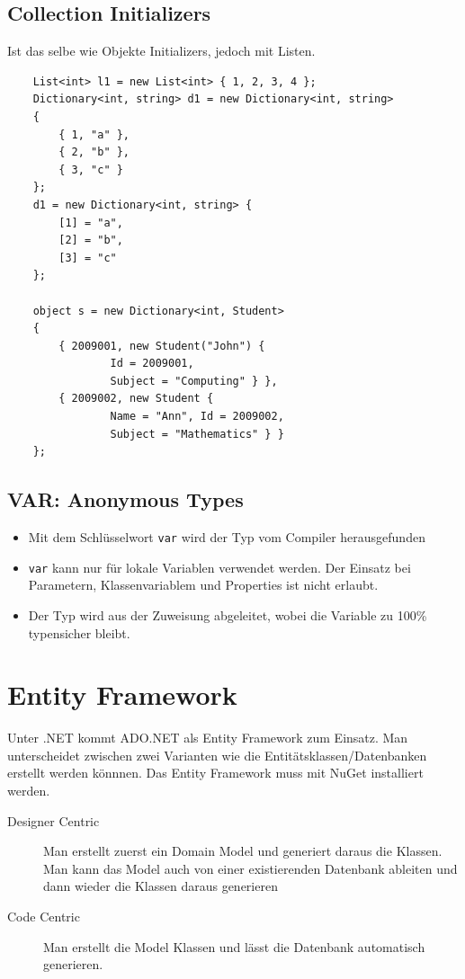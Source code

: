 \subsection{Collection Initializers}
Ist das selbe wie Objekte Initializers, jedoch mit Listen.
\begin{lstlisting}
	List<int> l1 = new List<int> { 1, 2, 3, 4 };
	Dictionary<int, string> d1 = new Dictionary<int, string>
	{
		{ 1, "a" },
		{ 2, "b" },
		{ 3, "c" }
	};
	d1 = new Dictionary<int, string> {
		[1] = "a",
		[2] = "b",
		[3] = "c"
	};
	
	object s = new Dictionary<int, Student>
	{
		{ 2009001, new Student("John") {
				Id = 2009001,
				Subject = "Computing" } },
		{ 2009002, new Student {
				Name = "Ann", Id = 2009002,
				Subject = "Mathematics" } }
	};
\end{lstlisting}

\subsection{VAR: Anonymous Types}
\begin{itemize}
	\item Mit dem Schlüsselwort \lstinline|var| wird der Typ vom Compiler herausgefunden
	\item \lstinline|var| kann nur für lokale Variablen verwendet werden. Der Einsatz bei Parametern, Klassenvariablem und Properties ist nicht erlaubt.
	\item Der Typ wird aus der Zuweisung abgeleitet, wobei die Variable zu 100\% typensicher bleibt.
\end{itemize}

\section{Entity Framework}
Unter .NET kommt ADO.NET als Entity Framework zum Einsatz. Man unterscheidet zwischen zwei Varianten wie die Entitätsklassen/Datenbanken erstellt werden könnnen. Das Entity Framework muss mit NuGet installiert werden.
\begin{description}
	\item[Designer Centric] Man erstellt zuerst ein Domain Model und generiert daraus die Klassen. Man kann das Model auch von einer existierenden Datenbank ableiten und dann wieder die Klassen daraus generieren
	\item[Code Centric] Man erstellt die Model Klassen und lässt die Datenbank automatisch generieren.
\end{description}

